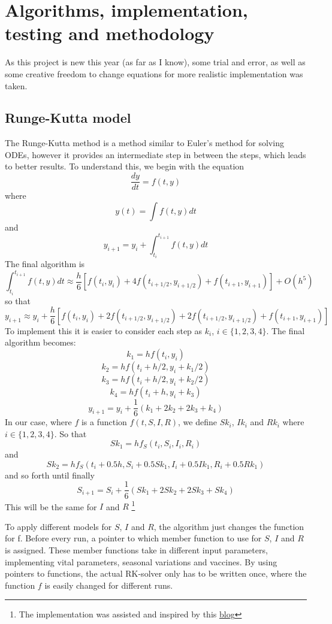 \section{Algorithms, implementation, testing and methodology}
As this project is new this year (as far as I know), some trial and error, as well as some creative freedom to change equations for more realistic implementation was taken.



\subsection{Runge-Kutta model}
The Runge-Kutta method is a method similar to Euler's method for solving ODEs, however it provides an intermediate step in between the steps, which leads to better results.
To understand this, we begin with the equation
$$
\frac{d y}{d t}=f(t, y)
$$
where
$$
y(t)=\int f(t, y) d t
$$
and
$$
y_{i+1}=y_{i}+\int_{t_{i}}^{t_{i+1}} f(t, y) d t
$$
The final algorithm is
$$
\int_{t_{i}}^{t_{i+1}} f(t, y) d t \approx \frac{h}{6}\left[f\left(t_{i}, y_{i}\right)+4 f\left(t_{i+1 / 2}, y_{i+1 / 2}\right)+f\left(t_{i+1}, y_{i+1}\right)\right]+O\left(h^{5}\right)
$$
so that
$$
y_{i+1} \approx y_{i}+\frac{h}{6}\left[f\left(t_{i}, y_{i}\right)+2 f\left(t_{i+1 / 2}, y_{i+1 / 2}\right)+2 f\left(t_{i+1 / 2}, y_{i+1 / 2}\right)+f\left(t_{i+1}, y_{i+1}\right)\right]
$$
To implement this it is easier to consider each step as $k_i$, $i\in \{1,2,3,4\}$.
The final algorithm becomes:
$$
k_{1}=h f\left(t_{i}, y_{i}\right)
$$
$$
k_{2}=h f\left(t_{i}+h / 2, y_{i}+k_{1} / 2\right)
$$
$$
k_{3}=h f\left(t_{i}+h / 2, y_{i}+k_{2} / 2\right)
$$
$$
k_{4}=h f\left(t_{i}+h, y_{i}+k_{3}\right)
$$
$$
y_{i+1}=y_{i}+\frac{1}{6}\left(k_{1}+2 k_{2}+2 k_{3}+k_{4}\right)
$$
In our case, where $f$ is a function $f(t,S,I,R)$, we define $Sk_i$, $Ik_i$ and $Rk_i$ where $i\in \{1,2,3,4\}$.
So that 
$$
Sk_1 = hf_S(t_i,S_i,I_i,R_i)
$$
and
$$
Sk_{2}=hf_S(t_i+0.5h,S_i+0.5Sk_1,I_i+0.5Ik_1,R_i+0.5Rk_1)
$$
and so forth until finally
$$
S_{i+1}=S_i+\frac{1}{6}(Sk_1+2Sk_2+2Sk_3+Sk_4)
$$
This will be the same for $I$ and $R$ \footnote{The implementation was assisted and inspired by this \href{https://blog.tonytsai.name/blog/2014-11-24-rk4-method-for-solving-sir-model/}{blog}} %

To apply different models for $S$, $I$ and $R$, the algorithm just changes the function for f.
Before every run, a pointer to which member function to use for $S$, $I$ and $R$ is assigned. 
These member functions take in different input parameters, implementing vital parameters, seasonal variations and vaccines.
By using pointers to functions, the actual RK-solver only has to be written once, where the function $f$ is easily changed for different runs.

